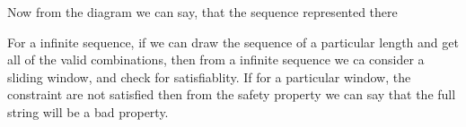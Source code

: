 Now from the diagram we can say, that the sequence represented there



For a infinite sequence, if we can draw the sequence of a particular length and get all of the valid
combinations, then from a infinite sequence we ca consider a sliding window, and check for satisfiablity.
If for a particular window, the constraint are not satisfied then from the safety property we can say
that the full string will be a bad property.

